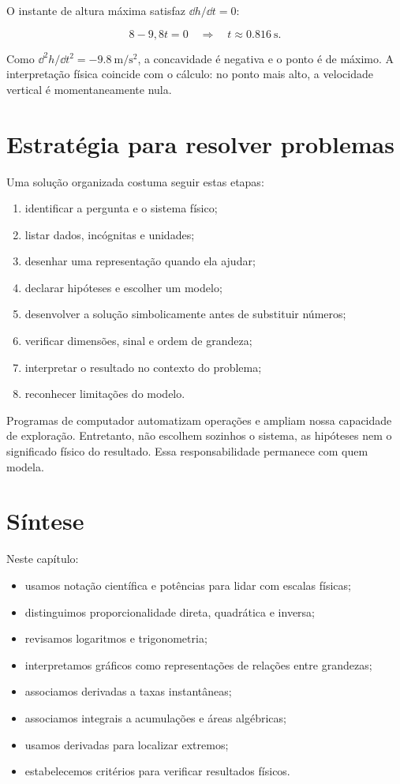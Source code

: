 O instante de altura máxima satisfaz $\dd h/\dd t=0$:

\begin{equation}
  8-9{,}8t=0
  \quad\Rightarrow\quad
  t\approx\SI{0.816}{\second}.
\end{equation}

Como $\dd^2h/\dd t^2=-\SI{9.8}{\meter\per\second\squared}$, a concavidade é negativa e o ponto é de máximo. A interpretação física coincide com o cálculo: no ponto mais alto, a velocidade vertical é momentaneamente nula.

\section{Estratégia para resolver problemas}

Uma solução organizada costuma seguir estas etapas:

\begin{enumerate}
  \item identificar a pergunta e o sistema físico;
  \item listar dados, incógnitas e unidades;
  \item desenhar uma representação quando ela ajudar;
  \item declarar hipóteses e escolher um modelo;
  \item desenvolver a solução simbolicamente antes de substituir números;
  \item verificar dimensões, sinal e ordem de grandeza;
  \item interpretar o resultado no contexto do problema;
  \item reconhecer limitações do modelo.
\end{enumerate}

Programas de computador automatizam operações e ampliam nossa capacidade de exploração. Entretanto, não escolhem sozinhos o sistema, as hipóteses nem o significado físico do resultado. Essa responsabilidade permanece com quem modela.

\section{Síntese}

Neste capítulo:

\begin{itemize}
  \item usamos notação científica e potências para lidar com escalas físicas;
  \item distinguimos proporcionalidade direta, quadrática e inversa;
  \item revisamos logaritmos e trigonometria;
  \item interpretamos gráficos como representações de relações entre grandezas;
  \item associamos derivadas a taxas instantâneas;
  \item associamos integrais a acumulações e áreas algébricas;
  \item usamos derivadas para localizar extremos;
  \item estabelecemos critérios para verificar resultados físicos.
\end{itemize}

